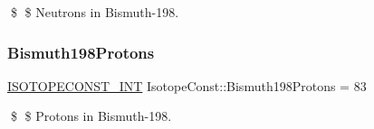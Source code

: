 \$ \$ Neutrons in Bismuth-\/198. \mbox{\label{group___isotope_const-_bismuth-_bi198_ga927bf064e53f35b713d0c5e2a223e49a}} 
\subsubsection{\texorpdfstring{Bismuth198\+Protons}{Bismuth198Protons}}
{\footnotesize\ttfamily \mbox{\hyperlink{group___isotope_const-_macros_ga5f18360b3e99483a35c32d789e62621c}{I\+S\+O\+T\+O\+P\+E\+C\+O\+N\+S\+T\+\_\+\+I\+NT}} Isotope\+Const\+::\+Bismuth198\+Protons = 83}

\$ \$ Protons in Bismuth-\/198. 